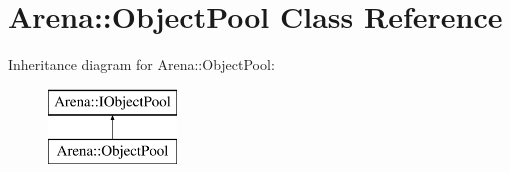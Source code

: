 \hypertarget{class_arena_1_1_object_pool}{\section{Arena\+:\+:Object\+Pool Class Reference}
\label{class_arena_1_1_object_pool}
}
Inheritance diagram for Arena\+:\+:Object\+Pool\+:\begin{figure}[H]
\begin{center}
\leavevmode
\includegraphics[height=2.000000cm]{class_arena_1_1_object_pool}
\end{center}
\end{figure}
